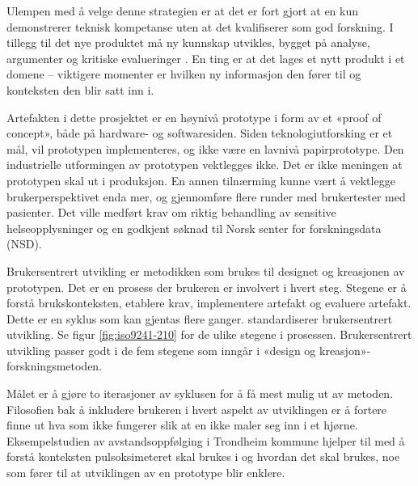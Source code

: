 Ulempen med å velge denne strategien er at det er fort gjort at en kun demonstrerer
teknisk kompetanse uten at det kvalifiserer som god forskning. I tillegg til det nye produktet må ny kunnskap utvikles, bygget på analyse, argumenter
og kritiske evalueringer \citep[s. 109]{oates}. En ting er at det lages et nytt produkt i et domene -- viktigere momenter er hvilken ny informasjon den fører
til og konteksten den blir satt inn i.

Artefakten i dette prosjektet er en høynivå prototype i form av et «proof of concept», både på hardware- og softwaresiden. Siden teknologiutforsking er et mål, vil
prototypen implementeres, og ikke være en lavnivå papirprototype. Den industrielle utformingen av prototypen vektlegges ikke. Det er
ikke meningen at prototypen skal ut i produksjon. En annen tilnærming kunne vært å vektlegge brukerperspektivet enda mer,
og gjennomføre flere runder med brukertester med pasienter. Det ville medført krav om riktig behandling av sensitive helseopplysninger og en godkjent søknad
til Norsk senter for forskningsdata (NSD).

Brukersentrert utvikling er metodikken som brukes til designet og kreasjonen av prototypen. Det er en prosess der brukeren er involvert i hvert steg.
Stegene er å forstå brukskonteksten, etablere krav, implementere artefakt og evaluere artefakt. Dette er en syklus som kan gjentas flere ganger.
\citet{dis20099241} standardiserer brukersentrert utvikling. Se figur \ref{fig:iso9241-210}
for de ulike stegene i prosessen.
Brukersentrert utvikling passer godt i de fem stegene som inngår i «design og kreasjon»-forskningsmetoden.

Målet er å gjøre to iterasjoner av syklusen for å få mest mulig ut av metoden. Filosofien bak å inkludere brukeren i hvert aspekt av utviklingen er å fortere
finne ut hva som ikke fungerer slik at en ikke maler seg inn i et hjørne. Eksempelstudien av avstandsoppfølging i Trondheim kommune
hjelper til med å forstå konteksten pulsoksimeteret skal brukes i og hvordan det skal brukes, noe som fører til at utviklingen av en prototype blir enklere.

